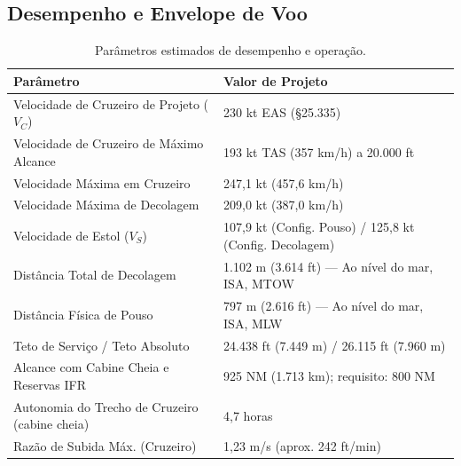 \subsection{Desempenho e Envelope de Voo}
\begin{table}[htbp]
\centering
\small
\begin{tabularx}{\textwidth}{lX}
\toprule
\textbf{Parâmetro} & \textbf{Valor de Projeto} \\
\midrule
Velocidade de Cruzeiro de Projeto ($V_C$) & 230 kt EAS (\S 25.335) \\
Velocidade de Cruzeiro de Máximo Alcance & 193 kt TAS (357 km/h) a 20.000 ft \\
Velocidade Máxima em Cruzeiro & 247,1 kt (457,6 km/h) \\
Velocidade Máxima de Decolagem & 209,0 kt (387,0 km/h) \\
Velocidade de Estol ($V_S$) & 107,9 kt (Config. Pouso) / 125,8 kt (Config. Decolagem) \\
Distância Total de Decolagem & 1.102 m (3.614 ft) --- Ao nível do mar, ISA, MTOW \\
Distância Física de Pouso & 797 m (2.616 ft) --- Ao nível do mar, ISA, MLW \\
Teto de Serviço / Teto Absoluto & 24.438 ft (7.449 m) / 26.115 ft (7.960 m) \\
Alcance com Cabine Cheia e Reservas IFR & 925 NM (1.713 km); requisito: 800 NM \\
Autonomia do Trecho de Cruzeiro (cabine cheia) & 4,7 horas \\
Razão de Subida Máx. (Cruzeiro) & 1,23 m/s (aprox. 242 ft/min) \\
\bottomrule
\end{tabularx}
\caption{Parâmetros estimados de desempenho e operação.}
\label{tab:desempenho}
\end{table}


